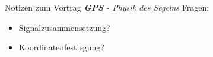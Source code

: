 
\newcommand{\ch}{$\checkmark$}

    {\huge Notizen zum Vortrag \textit{\textbf{GPS} - Physik des Segelns}}
    \tableofcontents
    Fragen:
    \begin{itemize}
        \item Signalzusammensetzung?
        \item Koordinatenfestlegung?
    \end{itemize}
    
    
    
    
    
    
    

